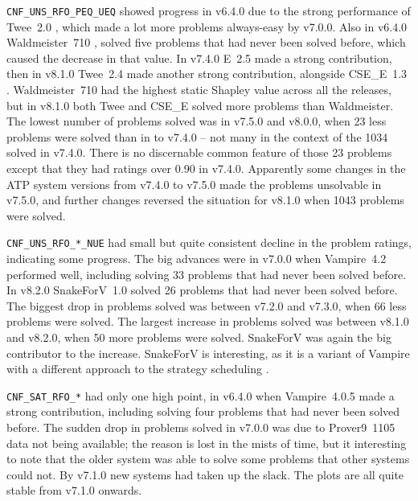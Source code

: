 \documentclass[runningheads]{llncs}
\begin{document}
{\tt CNF\_UNS\_RFO\_PEQ\_UEQ} showed progress in v6.4.0 due to the strong performance of
Twee~2.0 \cite{Sma21}, which made a lot more problems always-easy by v7.0.0.
Also in v6.4.0 Waldmeister~710 \cite{LH02}, solved five problems that had never been solved 
before, which caused the decrease in that value.
In v7.4.0 E~2.5 made a strong contribution, then in v8.1.0 Twee~2.4 made another strong 
contribution, alongside CSE\_E~1.3 \cite{XL+18}.
Waldmeister~710 had the highest static Shapley value across all the releases, but in
v8.1.0 both Twee and CSE\_E solved more problems than Waldmeister.
The lowest number of problems solved was in v7.5.0 and v8.0.0, when 23 less problems were solved
than in to v7.4.0 -- not many in the context of the 1034 solved in v7.4.0.
There is no discernable common feature of those 23 problems except that they had ratings over
0.90 in v7.4.0.
Apparently some changes in the ATP system versions from v7.4.0 to v7.5.0 made the problems
unsolvable in v7.5.0, and further changes reversed the situation for v8.1.0 when 1043 problems
were solved.
 
{\tt CNF\_UNS\_RFO\_*\_NUE} had small but quite consistent decline in the problem ratings, 
indicating some progress.
The big advances were in v7.0.0 when Vampire~4.2 performed well, including solving 33 problems
that had never been solved before.
In v8.2.0 SnakeForV~1.0 solved 26 problems that had never been solved before.
The biggest drop in problems solved was between v7.2.0 and v7.3.0, when 66 less problems were
solved.
The largest increase in problems solved was between v8.1.0 and v8.2.0, when 50 more problems
were solved.
SnakeForV was again the big contributor to the increase.
SnakeForV is interesting, as it is a variant of Vampire with a different approach to the strategy
scheduling \cite{Sud22}.

{\tt CNF\_SAT\_RFO\_*} had only one high point, in v6.4.0 when Vampire~4.0.5 made a strong
contribution, including solving four problems that had never been solved before.
The sudden drop in problems solved in v7.0.0 was due to Prover9~1105 \cite{McC-Prover9-URL}
data not being available; the reason is lost in the mists of time, but it interesting to note 
that the older system was able to solve some problems that other systems could not.
By v7.1.0 new systems had taken up the slack.
The plots are all quite stable from v7.1.0 onwards.
\end{document}

